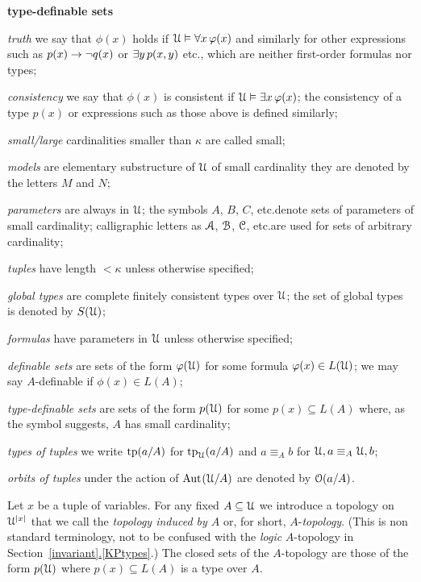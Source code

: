 \documentclass[creche.tex]{subfiles}
\begin{document}
\begin{litemize}{{\bf type-definable sets}}
\item[\emph{truth}] we say that $\phi(x)$ holds if $\EuScript U\vDash\forall x\,\varphi(x)$ and similarly for other expressions such as $p(x)\rightarrow\neg q(x)$ or $\exists y\,p(x,y)$ etc., which are neither first-order formulas nor types;
\item[\emph{consistency}] we say that $\phi(x)$ is consistent if $\EuScript U\vDash\exists x\,\varphi(x)$; the consistency of a type $p(x)$ or expressions such as those above is defined similarly;
\item[\emph{small/large}] cardinalities smaller than $\kappa$ are called small; 
\item[\emph{models}] are elementary substructure of $\EuScript U$ of small cardinality they are denoted by the letters $M$ and $N$;
\item[\emph{parameters}] are always in $\EuScript U$; the symbols $A$, $B$, $C$, etc.\@ denote sets of parameters of small cardinality; calligraphic letters as $\EuScript A$, $\EuScript B$, $\EuScript C$, etc.\@ are used for sets of arbitrary cardinality;
\item[\emph{tuples}] have length $<\kappa$ unless otherwise specified;
\item[\emph{global types}] are complete finitely consistent types over $\EuScript U$; the set of global types is denoted by $S(\EuScript U)$;
\item[\emph{formulas}] have parameters in $\EuScript U$ unless otherwise specified;
\item[\emph{definable sets}] are sets of the form $\varphi(\EuScript U)$ for some formula $\varphi(x)\in L(\EuScript U)$; we may say $A$-definable if $\phi(x)\in L(A)$;
\item[\emph{type-definable sets}] are sets of the form $p(\EuScript U)$ for some $p(x)\subseteq L(A)$ where, as the symbol suggests, $A$ has small cardinality;
\item[\emph{types of tuples}] we write ${\rm tp}(a/A)$ for ${\rm tp}_\EuScript U(a/A)$ and $a\equiv_A b$ for $\EuScript U,a \equiv_A \EuScript U,b$; 
\item[\emph{orbits of tuples}] under the action of ${\rm Aut\kern.15ex}(\EuScript U/A)$ are denoted by $\EuScript O(a/A)$.
\end{litemize}

Let $x$ be a tuple of variables. For any fixed $A\subseteq \EuScript U$ we introduce a topology on $\EuScript U^{|x|}$ that we call the \emph{topology induced by $A$} or, for short, \emph{$A\mbox{-}$topology}. 
(This is non standard terminology, not to be confused with the \textit{logic\/} $A\mbox{-}$topology in Section~\hyperref[invariant]{\ref*{invariant}.\ref*{KPtypes}}.)
The closed sets of the $A\mbox{-}$topology are those of the form $p(\EuScript U)$ where $p(x)\subseteq L(A)$ is a type over $A$.
\end{document}
